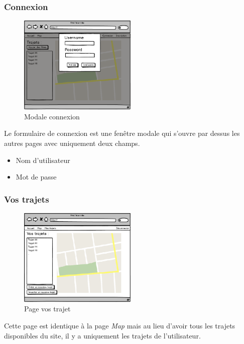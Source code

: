 \documentclass[a4paper]{article}
\begin{document}
\subsubsection{Connexion}
\begin{figure}[h]
\centering
\includegraphics[width=0.5\textwidth]{./Images/Interfaces/Connexin.png}
\caption{Modale connexion}
\end{figure}

Le formulaire de connexion est une fenêtre modale qui s'ouvre par dessus les autres pages avec uniquement deux champs.
\begin{itemize}
    \item Nom d'utilisateur
    \item Mot de passe
\end{itemize}


\subsubsection{Vos trajets}
\begin{figure}[h]
\centering
\includegraphics[width=0.5\textwidth]{./Images/Interfaces/VosTrajets.png}
\caption{Page vos trajet}
\end{figure}

Cette page est identique à la page \emph{Map} mais au lieu d'avoir tous les trajets disponibles du site, il y a uniquement les trajets de l'utilisateur.
\end{document}
